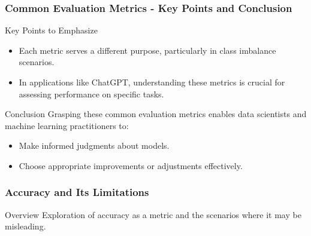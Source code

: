 \documentclass[aspectratio=169]{beamer}
\begin{document}
\begin{frame}[fragile]
    \frametitle{Common Evaluation Metrics - Key Points and Conclusion}
    \begin{block}{Key Points to Emphasize}
        \begin{itemize}
            \item Each metric serves a different purpose, particularly in class imbalance scenarios.
            \item In applications like ChatGPT, understanding these metrics is crucial for assessing performance on specific tasks.
        \end{itemize}
    \end{block}

    \begin{block}{Conclusion}
        Grasping these common evaluation metrics enables data scientists and machine learning practitioners to:
        \begin{itemize}
            \item Make informed judgments about models.
            \item Choose appropriate improvements or adjustments effectively.
        \end{itemize}
    \end{block}
\end{frame}

\begin{frame}[fragile]
    \frametitle{Accuracy and Its Limitations}
    \begin{block}{Overview}
        Exploration of accuracy as a metric and the scenarios where it may be misleading.
    \end{block}
\end{frame}
\end{document}
